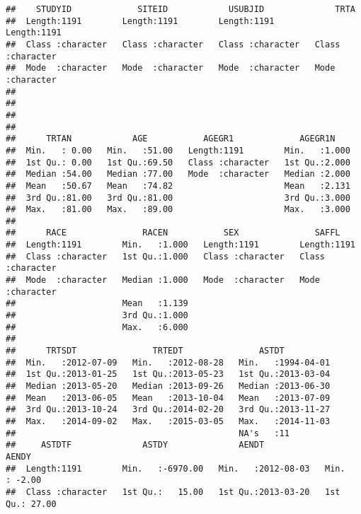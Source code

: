 \documentclass[]{book}
\begin{document}
\begin{verbatim}
##    STUDYID             SITEID            USUBJID              TRTA          
##  Length:1191        Length:1191        Length:1191        Length:1191       
##  Class :character   Class :character   Class :character   Class :character  
##  Mode  :character   Mode  :character   Mode  :character   Mode  :character  
##                                                                             
##                                                                             
##                                                                             
##                                                                             
##      TRTAN            AGE           AGEGR1             AGEGR1N     
##  Min.   : 0.00   Min.   :51.00   Length:1191        Min.   :1.000  
##  1st Qu.: 0.00   1st Qu.:69.50   Class :character   1st Qu.:2.000  
##  Median :54.00   Median :77.00   Mode  :character   Median :2.000  
##  Mean   :50.67   Mean   :74.82                      Mean   :2.131  
##  3rd Qu.:81.00   3rd Qu.:81.00                      3rd Qu.:3.000  
##  Max.   :81.00   Max.   :89.00                      Max.   :3.000  
##                                                                    
##      RACE               RACEN           SEX               SAFFL          
##  Length:1191        Min.   :1.000   Length:1191        Length:1191       
##  Class :character   1st Qu.:1.000   Class :character   Class :character  
##  Mode  :character   Median :1.000   Mode  :character   Mode  :character  
##                     Mean   :1.139                                        
##                     3rd Qu.:1.000                                        
##                     Max.   :6.000                                        
##                                                                          
##      TRTSDT               TRTEDT               ASTDT           
##  Min.   :2012-07-09   Min.   :2012-08-28   Min.   :1994-04-01  
##  1st Qu.:2013-01-25   1st Qu.:2013-05-23   1st Qu.:2013-03-04  
##  Median :2013-05-20   Median :2013-09-26   Median :2013-06-30  
##  Mean   :2013-06-05   Mean   :2013-10-04   Mean   :2013-07-09  
##  3rd Qu.:2013-10-24   3rd Qu.:2014-02-20   3rd Qu.:2013-11-27  
##  Max.   :2014-09-02   Max.   :2015-03-05   Max.   :2014-11-03  
##                                            NA's   :11          
##     ASTDTF              ASTDY              AENDT                AENDY       
##  Length:1191        Min.   :-6970.00   Min.   :2012-08-03   Min.   : -2.00  
##  Class :character   1st Qu.:   15.00   1st Qu.:2013-03-20   1st Qu.: 27.00  

\end{verbatim}
\end{document}
